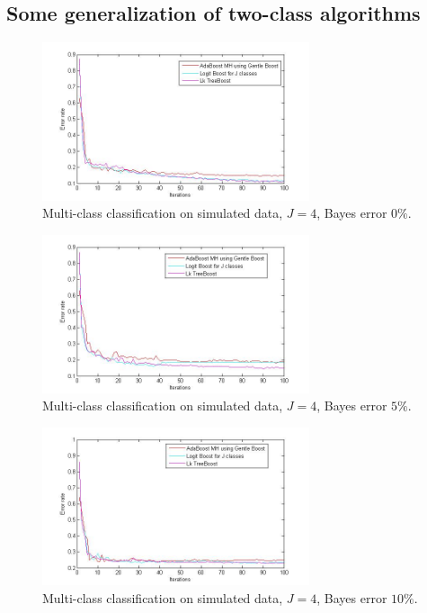\documentclass[a4paper,twoside,12pt]{article}
\begin{document}
\subsection{Some generalization of two-class algorithms}

\begin{figure}[ht]\centering
  	\includegraphics[width=0.7\textwidth]{multi_comp0.jpg}
  	\caption{Multi-class classification on simulated data, $J = 4$, Bayes error $0\%$.}
  	\label{multi_comp0}
\end{figure}

\begin{figure}[ht]\centering
  	\includegraphics[width=0.7\textwidth]{multi_comp1.jpg}
  	\caption{Multi-class classification on simulated data, $J = 4$, Bayes error $5\%$.}
  	\label{multi_comp1}
\end{figure}

\begin{figure}[ht]\centering
  	\includegraphics[width=0.7\textwidth]{multi_comp2.jpg}
  	\caption{Multi-class classification on simulated data, $J = 4$, Bayes error $10\%$.}
  	\label{multi_comp2}
\end{figure}
\end{document}
